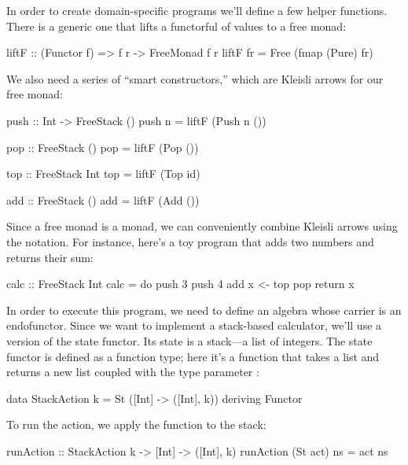 \documentclass[DaoFP]{subfiles}
\begin{document}
In order to create domain-specific programs we'll define a few helper functions. There is a generic one that lifts a functorful of values to a free monad:
\begin{haskell} 
liftF :: (Functor f) => f r -> FreeMonad f r
liftF fr = Free (fmap (Pure) fr)
\end{haskell}
We also need a series of ``smart constructors,'' which are Kleisli arrows for our free monad:
\begin{haskell}
push :: Int -> FreeStack ()
push n = liftF (Push n ())

pop :: FreeStack ()
pop = liftF (Pop ())

top :: FreeStack Int
top = liftF (Top id)

add :: FreeStack ()
add = liftF (Add ())
\end{haskell}

Since a free monad is a monad, we can conveniently combine Kleisli arrows using the  notation. For instance, here's a toy program that adds two numbers and returns their sum:
\begin{haskell}
calc :: FreeStack Int
calc = do
  push 3
  push 4
  add
  x <- top
  pop
  return x
\end{haskell}

In order to execute this program, we need to define an algebra whose carrier is an endofunctor. Since we want to implement a stack-based calculator, we'll use a version of the state functor. Its state is a stack---a list of integers. The state functor is defined as a function type; here it's a function that takes a list and returns a new list coupled with the type parameter :
\begin{haskell}
data StackAction k = St ([Int] -> ([Int], k))
  deriving Functor
\end{haskell}

To run the action, we apply the function to the stack:
\begin{haskell}
runAction :: StackAction k -> [Int] -> ([Int], k)
runAction (St act) ns = act ns
\end{haskell}
\end{document}
